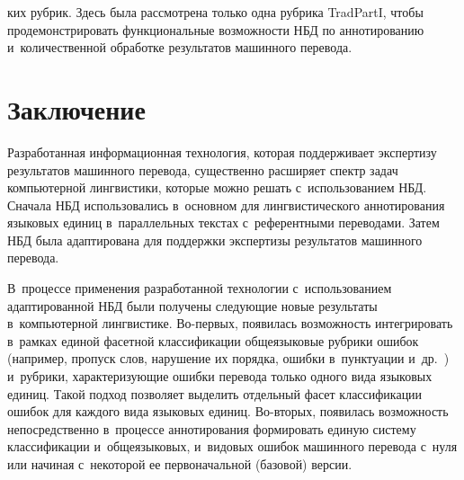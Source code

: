    \begin{multicols}{2}

\noindent
ких руб\-рик. Здесь была рассмотрена только одна 
руб\-ри\-ка TradPartI, чтобы продемонстрировать функциональные возможности 
НБД по аннотированию и~количественной обработке результатов машинного 
перевода.

\section{Заключение}

  Разработанная информационная технология, которая поддерживает 
экспертизу результатов машинного перевода, существенно расширяет спектр 
задач компьютерной лингвистики, которые можно решать с~использованием 
НБД. Сначала НБД использовались в~основном для лингвистического 
аннотирования языковых единиц в~параллельных текстах с~референтными 
переводами. Затем НБД была адаптирована для поддержки экспертизы 
результатов машинного перевода.
  
  В~процессе применения разработанной технологии с~использованием 
адаптированной НБД были\linebreak
 получены следующие новые результаты 
в~компьютерной лингвистике. Во-пер\-вых, появилась возмож\-ность 
интегрировать в~рамках единой фасетной классификации общеязыковые 
рубрики ошибок (например, пропуск слов, нарушение их порядка, ошибки 
в~пунктуации и~др.~\cite{3-gz}) и~рубрики, характеризующие ошибки перевода 
только одного вида языковых единиц. Такой подход позволяет выделить 
отдельный фасет классификации ошибок для каждого вида языковых единиц. 
Во-вто\-рых, появилась возможность непосредственно в~процессе 
аннотирования формировать единую систему классификации и~общеязыковых, и~видовых ошибок машинного перевода с~нуля или начиная с~некоторой ее 
первоначальной (базовой) версии.
  

\end{multicols}
